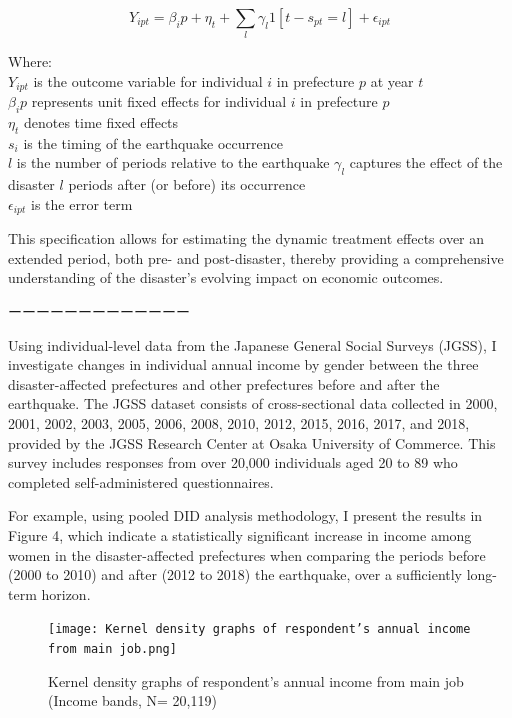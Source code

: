 \documentclass[12pt,halfline,a4paper]{ouparticle}
\begin{document}
\begin{equation}
Y_{ipt} = \beta_ip + \eta_t + \sum_{l}^{} \gamma_l 1 [t-s_{pt} = l] + \epsilon_{ipt}
\end{equation}

Where: \\
$Y_{ipt}$ is the outcome variable for individual \( i \) in prefecture \( p \) at year \( t \) \\
$\beta_ip$ represents unit fixed effects for individual \( i \) in prefecture \( p \) \\
$\eta_t$ denotes time fixed effects \\
$s_{i}$ is the timing of the earthquake occurrence \\
$l$ is the number of periods relative to the earthquake
$\gamma_l$ captures the effect of the disaster $l$ periods after (or before) its occurrence \\
$\epsilon_{ipt}$ is the error term

This specification allows for estimating the dynamic treatment effects over an extended period, both pre- and post-disaster, thereby providing a comprehensive understanding of the disaster's evolving impact on economic outcomes.

ーーーーーーーーーーーーー

Using individual-level data from the Japanese General Social Surveys (JGSS), I investigate changes in individual annual income by gender between the three disaster-affected prefectures and other prefectures before and after the earthquake. The JGSS dataset consists of cross-sectional data collected in 2000, 2001, 2002, 2003, 2005, 2006, 2008, 2010, 2012, 2015, 2016, 2017, and 2018, provided by the JGSS Research Center at Osaka University of Commerce. This survey includes responses from over 20,000 individuals aged 20 to 89 who completed self-administered questionnaires. 

For example, using pooled DID analysis methodology, I present the results in Figure 4, which indicate a statistically significant increase in income among women in the disaster-affected prefectures when comparing the periods before (2000 to 2010) and after (2012 to 2018) the earthquake, over a sufficiently long-term horizon.


\begin{figure}[h!]
    \centering
    \texttt{[image: Kernel density graphs of respondent’s annual income from main job.png]}  %
    \caption{Kernel density graphs of respondent’s annual income from main job (Income bands, N= 20,119)}
    \label{fig:conceptual_model}
\end{figure}
\end{document}
